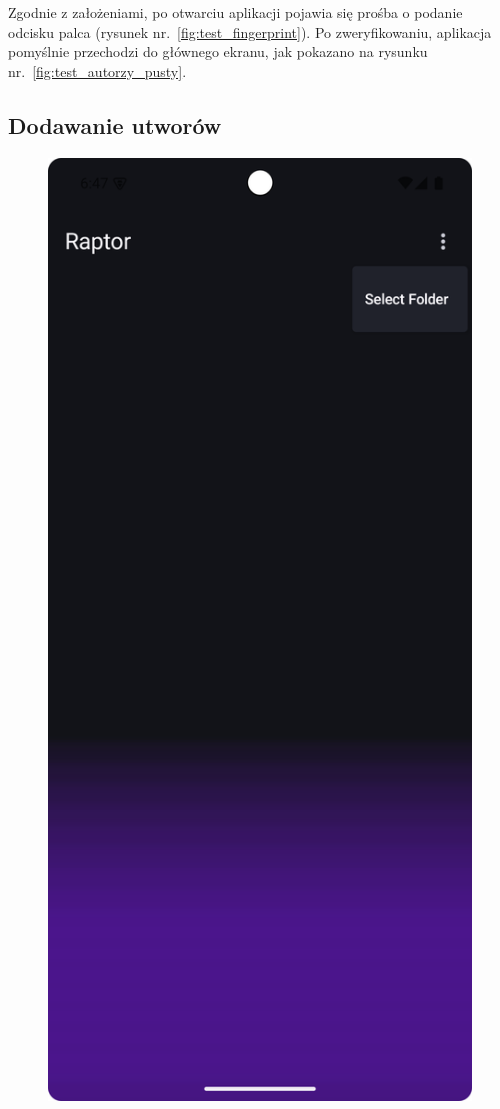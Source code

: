 Zgodnie z założeniami, po otwarciu aplikacji pojawia się prośba o podanie odcisku palca (rysunek nr.~\ref{fig:test_fingerprint}). Po zweryfikowaniu, aplikacja pomyślnie przechodzi do głównego ekranu, jak pokazano na rysunku nr.~\ref{fig:test_autorzy_pusty}.

\subsection{Dodawanie utworów}

\begin{figure}[H]
	\centering
	\includegraphics[width=1\textwidth]{images/tutorial_select_folder.png}

\end{figure}
